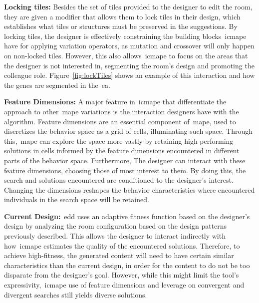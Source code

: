\textbf{Locking tiles:} Besides the set of tiles provided to the designer to edit the room, they are given a modifier that allows them to lock tiles in their design, which establishes what tiles or structures must be preserved in the suggestions. By locking tiles, the designer is effectively constraining the building blocks~\acrshort{icmape} have for applying variation operators, as mutation and crossover will only happen on non-locked tiles. However, this also allows~\acrshort{icmape} to focus on the areas that the designer is not interested in, segmenting the room's design and promoting the colleague role. Figure~\ref{fig:lockTiles} shows an example of this interaction and how the genes are segmented in the~\acrshort{ea}.


\textbf{Feature Dimensions:} A major feature in~\acrshort{icmape} that differentiate the approach to other~\acrshort{mape} variations is the interaction designers have with the algorithm. Feature dimensions are an essential component of~\acrshort{mape}, used to discretizes the behavior space as a grid of cells, illuminating such space. Through this,~\acrshort{mape} can explore the space more vastly by retaining high-performing solutions in cells informed by the feature dimensions encountered in different parts of the behavior space. Furthermore, The designer can interact with these feature dimensions, choosing those of most interest to them. By doing this, the search and solutions encountered are conditioned to the designer's interest. Changing the dimensions reshapes the behavior characteristics where encountered individuals in the search space will be retained.

\textbf{Current Design:}~\acrshort{edd} uses an adaptive fitness function based on the designer's design by analyzing the room configuration based on the design patterns previously described. This allows the designer to interact indirectly with how~\acrshort{icmape} estimates the quality of the encountered solutions. Therefore, to achieve high-fitness, the generated content will need to have certain similar characteristics than the current design, in order for the content to do not be too disparate from the designer's goal. However, while this might limit the tool's expressivity,~\acrshort{icmape} use of feature dimensions and leverage on convergent and divergent searches still yields diverse solutions.

